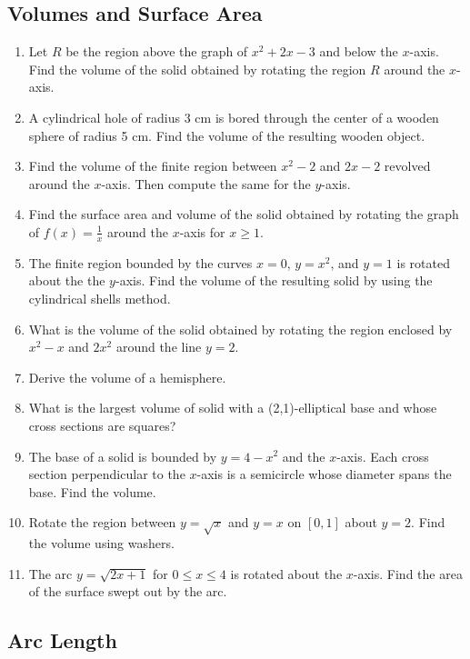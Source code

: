 \documentclass{article}
\begin{document}
\subsection{Volumes and Surface Area}
\begin{enumerate}
\item Let $R$ be the region above the graph of $x^2+2x-3$ and below the $x$-axis. Find the volume of the solid obtained by rotating the region $R$ around the $x$-axis.
\item A cylindrical hole of radius 3 cm is bored through the center of a wooden sphere of radius 5 cm. Find the volume of the resulting wooden object.
\item Find the volume of the finite region between $x^2-2$ and $2x-2$ revolved around the $x$-axis. Then compute the same for the $y$-axis.
\item Find the surface area and volume of the solid obtained by rotating the graph of $f(x)=\frac{1}{x}$ around the $x$-axis for $x\geq1$.
\item The finite region bounded by the curves $x = 0$, $y = x^2$, and $y = 1$ is rotated about the the $y$-axis. Find the volume of the resulting solid by using the cylindrical shells method.
\item What is the volume of the solid obtained by rotating the region enclosed by $x^2-x$ and $2x^2$ around the line $y=2$.
\item Derive the volume of a hemisphere.
\item What is the largest volume of solid with a (2,1)-elliptical base and whose cross sections are squares?
\item The base of a solid is bounded by $y=4-x^2$ and the $x$-axis. Each cross section perpendicular to the $x$-axis is a semicircle whose diameter spans the base. Find the volume.
\item Rotate the region between $y=\sqrt{x}$ and $y=x$ on $[0,1]$ about $y=2$. Find the volume using washers.
\item The arc $y=\sqrt{2x+1}$ for $0\leq x\leq 4$ is rotated about the $x$-axis. Find the area of the surface swept out by the arc.
\end{enumerate}



\subsection{Arc Length}
\end{document}
